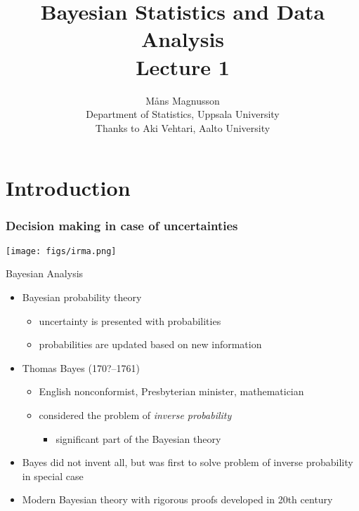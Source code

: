 \documentclass[10pt]{beamer}
\title[]{{\color{black}Bayesian Statistics and Data Analysis \\ Lecture 1}}
\author[]{M{\aa}ns Magnusson \\ Department of Statistics, Uppsala University \\ Thanks to Aki Vehtari, Aalto University}
\date{}
\begin{document}
\frame{\titlepage
}



\section{Introduction}
\frame{\sectionpage}

\begin{frame}

  \frametitle{Decision making in case of uncertainties}

  \begin{center}
    \texttt{[image: figs/irma.png]}
  \end{center}
\end{frame}


\begin{frame}{Bayesian Analysis}

  \begin{itemize}
  \item Bayesian probability theory
    \begin{itemize}
    \item uncertainty is presented with probabilities
    \item probabilities are updated based on new information
    \end{itemize}
    \pause
    \item Thomas Bayes (170?--1761)
    \begin{itemize}
    \item English nonconformist, Presbyterian minister,
      mathematician
    \item considered the problem of {\it inverse probability}
      \begin{itemize}
        \item significant part of the Bayesian theory
      \end{itemize}
  \end{itemize}
  \pause
  \item Bayes did not invent all, but was first to solve problem of
    inverse probability in special case
  \item Modern Bayesian theory with rigorous proofs developed in
    20th century
\end{itemize}
\end{frame}
\end{document}
